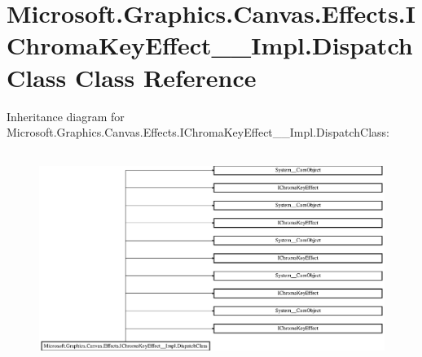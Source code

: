 \hypertarget{class_microsoft_1_1_graphics_1_1_canvas_1_1_effects_1_1_i_chroma_key_effect_____impl_1_1_dispatch_class}{}\section{Microsoft.\+Graphics.\+Canvas.\+Effects.\+I\+Chroma\+Key\+Effect\+\_\+\+\_\+\+Impl.\+Dispatch\+Class Class Reference}
\label{class_microsoft_1_1_graphics_1_1_canvas_1_1_effects_1_1_i_chroma_key_effect_____impl_1_1_dispatch_class}
Inheritance diagram for Microsoft.\+Graphics.\+Canvas.\+Effects.\+I\+Chroma\+Key\+Effect\+\_\+\+\_\+\+Impl.\+Dispatch\+Class\+:\begin{figure}[H]
\begin{center}
\leavevmode
\includegraphics[height=6.936937cm]{class_microsoft_1_1_graphics_1_1_canvas_1_1_effects_1_1_i_chroma_key_effect_____impl_1_1_dispatch_class}
\end{center}
\end{figure}
